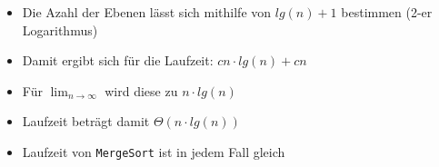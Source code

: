 \documentclass[
    ngerman,
    color=3b,
    load_common, %
    summary,
    boxarc,
]{tuda_summary}
\begin{document}
\begin{itemize}
\begin{itemize}
\begin{itemize}
                        \item Die Azahl der Ebenen lässt sich mithilfe von $lg(n) + 1$ bestimmen (2-er Logarithmus)
                        \item Damit ergibt sich für die Laufzeit: $cn \cdot lg(n)+cn$
                        \item Für $\lim_{n \rightarrow \infty}$ wird diese zu $n \cdot lg(n)$
                        \item Laufzeit beträgt damit $\Theta(n \cdot lg(n))$
                        \item Laufzeit von \texttt{MergeSort} ist in jedem Fall gleich
                    \end{itemize}

          \end{itemize}
\end{itemize}
\clearpage
\end{document}
